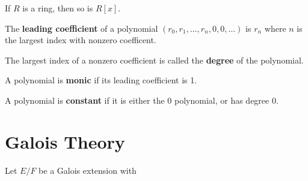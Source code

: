 \documentclass{article}
\newcommand{\Extension}[2][F]{#2/#1}
\begin{document}
\begin{Theorem}[1c]
  If $R$ is a ring, then so is $R[x]$.
\end{Theorem} 

\begin{Definition}[1d]
  The \textbf{leading coefficient} of a polynomial 
$(r_0,r_1,\ldots,r_n,0,0,\ldots)$ is $r_n$ where 
  $n$ is the largest index with nonzero coefficent.
\end{Definition} 

\begin{Definition} 
  The largest index of a nonzero coefficient is called the \textbf{degree} of the polynomial.
\end{Definition} 

\begin{Definition} 
  A polynomial is \textbf{monic} if its leading coefficient is 1.
\end{Definition}

\begin{Definition} 
  A polynomial is \textbf{constant} if it is either the 0 polynomial, or has degree 0.
\end{Definition}


\section{Galois Theory}

\begin{Theorem}
  Let $\Extension{E}$ be a Galois extension with 

\end{Theorem} 




\end{document}
